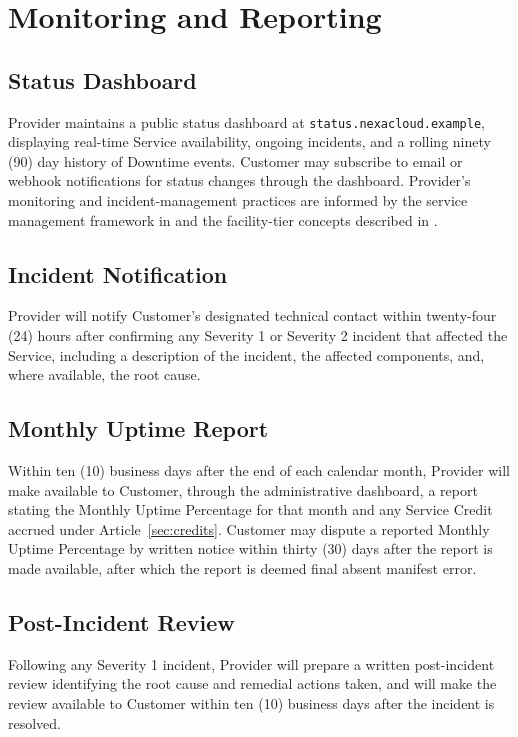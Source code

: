 \section{Monitoring and Reporting}
\label{sec:monitoring}

\subsection{Status Dashboard}
Provider maintains a public status dashboard at \texttt{status.nexacloud.example}, displaying real-time Service availability, ongoing incidents, and a rolling ninety (90) day history of Downtime events. Customer may subscribe to email or webhook notifications for status changes through the dashboard. Provider's monitoring and incident-management practices are informed by the service management framework in \citet{iso20000} and the facility-tier concepts described in \citet{tia942}.

\subsection{Incident Notification}
\label{sec:incident-notification}
Provider will notify Customer's designated technical contact within twenty-four (24) hours after confirming any Severity 1 or Severity 2 incident that affected the Service, including a description of the incident, the affected components, and, where available, the root cause.

\subsection{Monthly Uptime Report}
Within ten (10) business days after the end of each calendar month, Provider will make available to Customer, through the administrative dashboard, a report stating the Monthly Uptime Percentage for that month and any Service Credit accrued under Article~\ref{sec:credits}. Customer may dispute a reported Monthly Uptime Percentage by written notice within thirty (30) days after the report is made available, after which the report is deemed final absent manifest error.

\subsection{Post-Incident Review}
Following any Severity 1 incident, Provider will prepare a written post-incident review identifying the root cause and remedial actions taken, and will make the review available to Customer within ten (10) business days after the incident is resolved.
